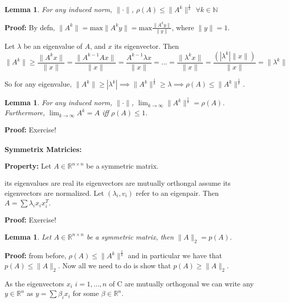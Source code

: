 \documentclass[titlepage]{article}
\theoremstyle{plain}
\newtheorem{lem}[thm]{Lemma}
\theoremstyle{definition}
\theoremstyle{remark}
\begin{document}
\begin{lem}
For any induced norm, $\| \cdot \|$, $\rho(A) \leq \|A^k\|^{\frac{1}{k}}$
$\forall k \in \mathbb{N}$
\end{lem}

\noindent \textbf{Proof: } By defn, $\|A^k\| = \text{max}\|A^k y\| =
\text{max}\frac{\|A^k y\|}{\|y\|}$, where $\|y\| = 1$.

Let $\lambda$ be an eigenvalue of $A$, and $x$ its eigenvector. Then
\[    \|A^k\| \geq \frac{\|A^kx\|}{\|x\|} = \frac{\|A^{k-1}Ax\|}{\|x\|} =
\frac{A^{k-1}\lambda x}{\|x\|} = \hdots = \frac{\|\lambda^kx\|}{\|x\|} =
\frac{(|\lambda^k|\|x\|)}{\|x\|} = \|\lambda^k\|\]

So for any eigenvalue, $\|A^k\| \geq | \lambda^k | \implies
\|A^k\|^{\frac{1}{k}} \geq \lambda \implies \rho(A) \leq \|A^k\|^{\frac{1}{k}}$.

\begin{lem}
For any induced norm, $\| \cdot \|$, $\lim_{k \to \infty} \|A^k\|^{\frac{1}{k}}
= \rho(A)$. Furthermore, $\lim_{k \to \infty} A^k = A$ iff $\rho(A) \leq 1$.
\end{lem}

\noindent \textbf{Proof: } Exercise!\\\\
\textbf{Symmetrix Matricies: }

\noindent \textbf{Property: } Let $A \in \mathbb{R}^{n\times n}$ be a symmetric matrix.
\begin{outline}[enumerate]
\1 its eigenvalues are real
\1 its eigenvectors are mutually orthongal
\1 assume its eigenvectors are normalized. Let $(\lambda_i, v_i)$ refer to an
eigenpair. Then $A = \sum \lambda_i x_i x_i^T$.
\end{outline}

\noindent \textbf{Proof: } Exercise!

\begin{lem}
Let $A \in \mathbb{R}^{n \times n}$ be a symmetric matrix, then $\|A\|_2 =
p(A)$.\\
\end{lem}
\noindent \textbf{Proof: } from before, $\rho(A) \leq \|A^k\|^{\frac{1}{k}}$ and
in particular we have that $p(A) \leq \|A\|_2$. Now all we need to do is show
that $p(A) \geq \|A\|_2$.

\noindent As the eigenvectors $x_i$ $i = 1, \hdots, n$ of C are mutually
orthogonal we can write any $y \in \mathbb{R}^n$ as $y = \sum \beta_i x_i$ for
some $\beta \in \mathbb{R}^n$.\\\\
\end{document}
